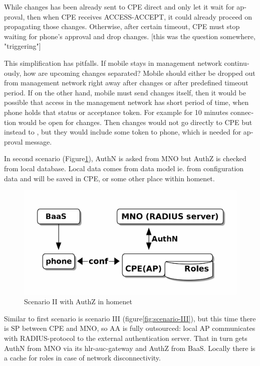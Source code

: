 \documentclass[12pt,a4paper,english]{tutthesis}
\begin{document}
\begin{otherlanguage}{english}
\begin{enumerate}
While changes has been already sent to CPE direct and only let it
wait for approval, then when CPE receives ACCESS-ACCEPT, it could
already proceed on propagating those
changes.  Otherwise, after certain timeout, CPE must stop waiting
for phone's approval and drop changes. [this was the question
somewhere, "triggering"]
\end{enumerate}

This simplification has pitfalls. If mobile stays in management
network continuously, how are upcoming changes separated? Mobile should
either be dropped out from management network right away after changes or
after predefined timeout period.  If on the other hand, mobile must
send changes itself, then it would be possible that access in the
management network has short period of time, when phone 
holds that status or acceptance token. For example for 10 minutes connection
would be open for changes. Then changes would not go directly to CPE
but instead to , but they would include some token to phone, which is
needed for approval message.


\label{scenario-ii}

In second scenario (Figure\ref{fig:scenario-II}), AuthN is asked from MNO but
AuthZ is checked from local database. Local data comes from data model
ie. from configuration data and will be saved in CPE, or some other
place within homenet.


\begin{figure}[htb]
\centering
\includegraphics[width=.9\linewidth]{scenII.png}
\caption{\label{fig:scenario-II}Scenario II with AuthZ in homenet}
\end{figure}


\label{scenario-iii}

Similar to first scenario is scenario III (figure\ref{fig:scenario-III}), 
but this time there is SP between CPE and MNO, so AA is fully outsourced:
local AP communicates with RADIUS-protocol to the external
authentication server. That in turn gets AuthN from MNO via its
hlr-auc-gateway and AuthZ from BaaS.
Locally there is a cache for roles in case of network disconnectivity.


\end{otherlanguage}
\end{document}
